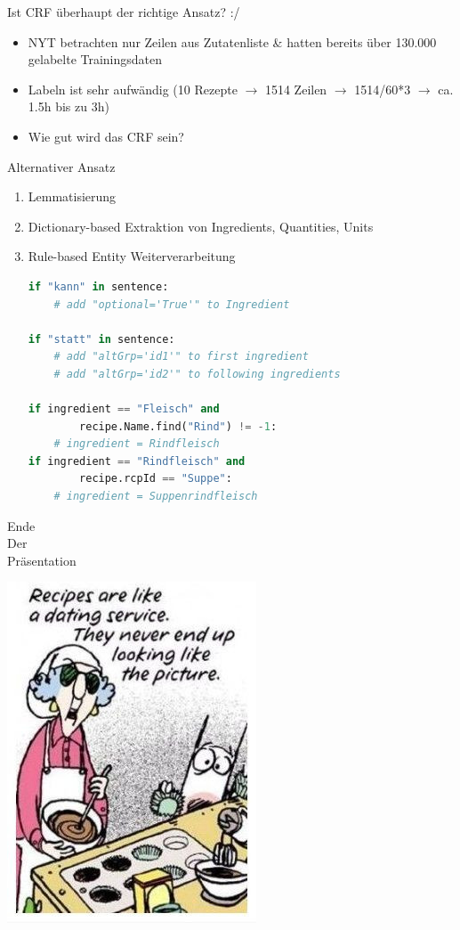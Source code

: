 \documentclass[12pt]{beamer}
\begin{document}
\begin{frame}{Ist CRF überhaupt der richtige Ansatz? :/}
	\begin{itemize}
		\item NYT betrachten nur Zeilen aus Zutatenliste \& hatten bereits über 130.000 gelabelte Trainingsdaten
		\item Labeln ist sehr aufwändig (10 Rezepte $\rightarrow$ 1514 Zeilen $\rightarrow$ 1514/60*3 $\rightarrow$ ca. 1.5h bis zu 3h)
		\item Wie gut wird das CRF sein?
	\end{itemize}
\end{frame}


\begin{frame}[fragile]{Alternativer Ansatz}
	\begin{enumerate}
		\item Lemmatisierung
		\item Dictionary-based Extraktion von Ingredients, Quantities, Units
		\item Rule-based Entity Weiterverarbeitung
		\begin{lstlisting}[language=Python]
if "kann" in sentence:
	# add "optional='True'" to Ingredient

if "statt" in sentence:
	# add "altGrp='id1'" to first ingredient
	# add "altGrp='id2'" to following ingredients  
	
if ingredient == "Fleisch" and
		recipe.Name.find("Rind") != -1:
	# ingredient = Rindfleisch
if ingredient == "Rindfleisch" and
		recipe.rcpId == "Suppe":
	# ingredient = Suppenrindfleisch
		\end{lstlisting}
	\end{enumerate}
\end{frame}
	
\begin{frame}
	\begin{minipage}{0.2\textwidth}
		\begin{center} \Large
			Ende\\
			Der \\
			Präsentation
		\end{center}			
	\end{minipage}
	\begin{minipage}{0.65\textwidth}
		\hspace{2cm}\includegraphics[scale=0.7]{Images/Recipes-are-like-a-dating-service}
	\end{minipage}
\end{frame}
\end{document}
